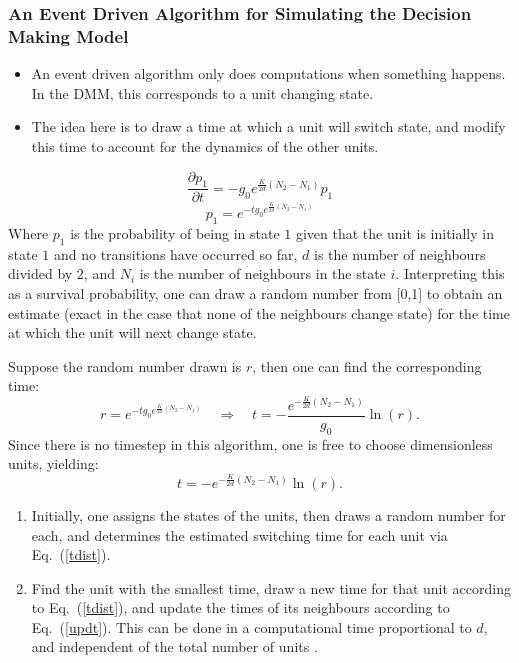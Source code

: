 \documentclass{beamer}
\newcounter{saveenumi}
\newcommand{\seti}{\setcounter{saveenumi}{\value{enumi}}}
\begin{document}
\everymath{\displaystyle}
\begin{frame}
\frametitle{An Event Driven Algorithm for Simulating the Decision Making
Model}
\begin{itemize}
\item An event driven algorithm only does computations when something happens.
In the DMM, this corresponds to a unit changing state.

\item The idea here is to draw a time at which a unit will switch state, and
modify this time to account for the dynamics of the other units.
\end{itemize}
\begin{equation}
\frac{\partial p_1}{\partial t}=-g_0 e^{\frac{K}{2d}(N_2-N_1)}p_1
\end{equation}
\begin{equation}
p_1=e^{-tg_0 e^{\frac{K}{2d}(N_2-N_1)}}
\end{equation}
Where $p_1$ is the probability of being in state $1$ given that the unit is initially in state $1$ and no transitions have occurred so far, $d$ is the number of neighbours divided by $2$, and $N_i$ is the number of neighbours in the state $i$.  Interpreting this as a survival probability, one can draw a random
number from [0,1] to obtain an estimate (exact in the case that none of
the neighbours change state) for the time at which the unit will next
change state.
\end{frame}
\begin{frame}
Suppose the random number drawn is $r$, then one can find the
corresponding time:
\begin{equation}
r=e^{-tg_0 e^{\frac{K}{2d}(N_2-N_1)}}\quad\Rightarrow\quad t=-\frac{e^
{-\frac{K}{2d}(N_2-N_1)}}{g_0}\ln(r).
\end{equation}
Since there is no timestep in this algorithm, one is free to choose
dimensionless units, yielding:
\begin{equation}\label{tdist}
t=-e^{-\frac{K}{2d}(N_2-N_1)}\ln(r).
\end{equation}
\begin{enumerate}
\item Initially, one assigns the states of the units, then draws a
random number for each, and determines the estimated switching time for
each unit via Eq.~(\ref{tdist}).
\item Find the unit with the smallest time, draw a new time for that
unit according to Eq.~(\ref{tdist}), and update the times of its
neighbours according to Eq.~(\ref{updt}).  This can be done in a
computational time proportional to $d$, and independent of the total
number of units \cite{O1BPQ}.
\seti
\end{enumerate}
\end{frame}
\end{document}
